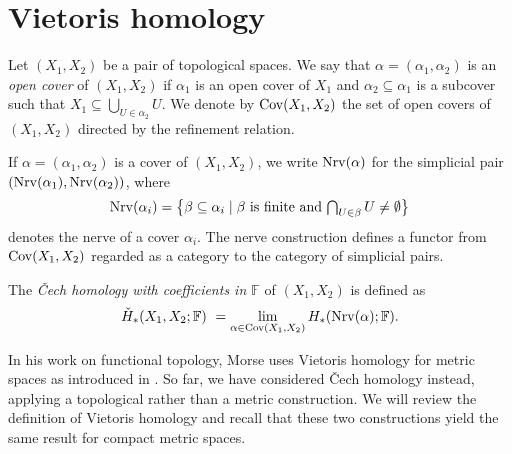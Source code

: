 
\section{Vietoris homology} \label{s:vietoris}

Let $(X_{1},X_{2})$ be a pair of topological spaces. We say that $\alpha = (\alpha_1, \alpha_2)$ is an \emph{open cover} of $(X_1, X_2)$ if $\alpha_1$ is an open cover of $X_1$ and $\alpha_2 \subseteq \alpha_1$ is a subcover such that $X_1 \subseteq \bigcup_{U \in \alpha_2} U$.
We denote by $\operatorname{Cov}(X_{1}, X_{2})$ the set of open covers of $(X_{1}, X_{2})$ directed by the refinement relation. 

If $\alpha = (\alpha_{1}, \alpha_{2})$ is a cover of $(X_{1}, X_{2})$, we write $\operatorname{Nrv}(\alpha)$ for the simplicial pair $(\operatorname{Nrv}(\alpha_{1}),\operatorname{Nrv}(\alpha_{2}))$, where 
\[
\operatorname{Nrv}(\alpha_{i}) =
\big\{ \beta \subseteq \alpha_{i} \mid \beta \text{ is finite and } \textstyle{\bigcap_{U \in \beta}} \, U \neq \emptyset \big\}
\]
denotes the nerve of a cover $\alpha_{i}$.
The nerve construction defines a functor from $\operatorname{Cov}(X_{1},X_{2})$ regarded as a category to the category of simplicial pairs. 

The \emph{\v{C}ech homology with coefficients in $\mathbb{F}$} of $(X_{1},X_{2})$ is defined as
\[
\check{H}_{*}(X_{1}, X_{2}; \mathbb{F}) \ =
\lim_{\alpha \in \operatorname{Cov}(X_{1}, X_{2})} H_{*}(\operatorname{Nrv}(\alpha); \mathbb{F}).
\]

In his work on functional topology, Morse uses Vietoris homology for metric spaces as introduced in \cite{MR1512371}. So far, we have considered \v{C}ech homology instead, applying a topological rather than a metric construction.
We will review the definition of Vietoris homology and recall that these two constructions yield the same result for compact metric spaces.

